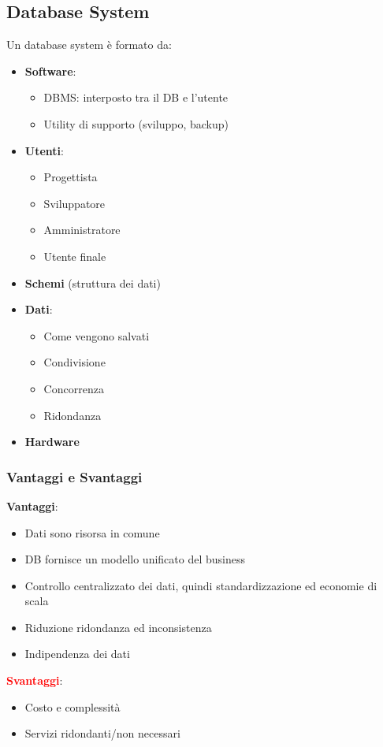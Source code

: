 \documentclass[12pt,a4paper]{article}
\begin{document}
\subsection{Database System}
Un database system è formato da:
\begin{itemize}
\item \textbf{Software}:
\begin{itemize}
\item DBMS: interposto tra il DB e l'utente
\item Utility di supporto (sviluppo, backup)
\end{itemize}
\item \textbf{Utenti}:
\begin{itemize}
\item Progettista
\item Sviluppatore
\item Amministratore
\item Utente finale
\end{itemize}
\item \textbf{Schemi} (struttura dei dati)
\item \textbf{Dati}:
\begin{itemize}
\item Come vengono salvati
\item Condivisione
\item Concorrenza
\item Ridondanza
\end{itemize}
\item \textbf{Hardware}
\end{itemize}

\subsubsection{Vantaggi e Svantaggi}
\textcolor{gg}{\textbf{Vantaggi}}:
\begin{itemize}
\item Dati sono risorsa in comune
\item DB fornisce un modello unificato del business
\item Controllo centralizzato dei dati, quindi standardizzazione ed economie di scala
\item Riduzione ridondanza ed inconsistenza
\item Indipendenza dei dati
\end{itemize}
\textcolor{red}{\textbf{Svantaggi}}:
\begin{itemize}
\item Costo e complessità
\item Servizi ridondanti/non necessari
\end{itemize}
\end{document}
